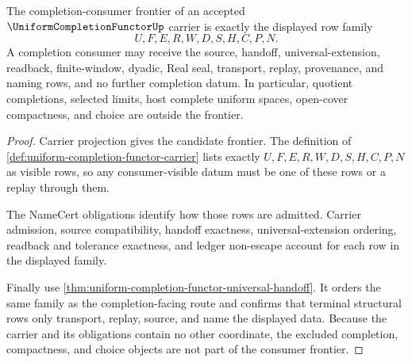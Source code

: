 \begin{theorem}
\label{thm:uniform-completion-functor-completion-consumer-frontier}
The completion-consumer frontier of an accepted $\UniformCompletionFunctorUp$ carrier is exactly the displayed row family
$$
U,F,E,R,W,D,S,H,C,P,N .
$$
A completion consumer may receive the source, handoff, universal-extension, readback, finite-window, dyadic, Real seal, transport, replay, provenance, and naming rows, and no further completion datum. In particular, quotient completions, selected limits, host complete uniform spaces, open-cover compactness, and choice are outside the frontier.
\end{theorem}
\begin{proof}
Carrier projection gives the candidate frontier. The definition of \autoref{def:uniform-completion-functor-carrier} lists exactly $U,F,E,R,W,D,S,H,C,P,N$ as visible rows, so any consumer-visible datum must be one of these rows or a replay through them.

The NameCert obligations identify how those rows are admitted. Carrier admission, source compatibility, handoff exactness, universal-extension ordering, readback and tolerance exactness, and ledger non-escape account for each row in the displayed family.

Finally use \autoref{thm:uniform-completion-functor-universal-handoff}. It orders the same family as the completion-facing route and confirms that terminal structural rows only transport, replay, source, and name the displayed data. Because the carrier and its obligations contain no other coordinate, the excluded completion, compactness, and choice objects are not part of the consumer frontier.
\end{proof}

